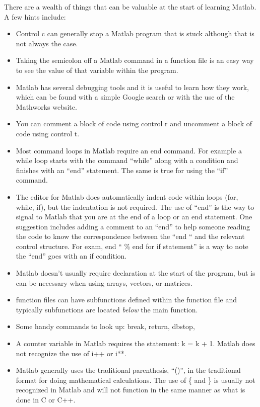 \documentclass[twoside]{article}
\begin{document}
There are a wealth of things that can be valuable at the start of learning Matlab. A few hints include:
\begin{itemize}

\item Control c can generally stop a Matlab program that is stuck although that is not always the case. 
\item Taking the semicolon off a Matlab command in a function file is an easy way to see the value of that variable within the program. 
\item Matlab has several debugging tools and it is useful to learn how they work, which can be found with a simple Google search or with the use of the Mathworks website. 
\item You can comment a block of code using control r and uncomment a block of code using control t. 
\item Most command loops in Matlab require an end command. For example a while loop starts with the command ``while'' along with a condition and finishes with an ``end'' statement. The same is true for using the ``if'' command. 
\item The editor for Matlab does automatically indent code within loops (for, while, if), but the indentation is not required. The use of ``end'' is the way to signal to Matlab that you are at the end of a loop or an end statement. One suggestion includes adding a comment to an ``end'' to help someone reading the code to know the correspondence between the ``end `` and the relevant control structure. For exam, end `` \% end for if statement'' is a way to note the ``end'' goes with an if condition. 
\item Matlab doesn't usually require declaration at the start of the program, but is can be necessary when using arrays, vectors, or matrices. 
\item function files can have subfunctions defined within the function file and typically subfunctions are located {\it below} the main function. 
\item Some handy commands to look up: break, return, dbstop, 
\item A counter variable in Matlab requires the statement: k = k + 1. Matlab does not recognize the use of i++ or i**.
\item Matlab generally uses the traditional parenthesis, ``()'', in the traditional format for doing mathematical calculations. The use of \{ and \} is usually not recognized in Matlab and will not function in the same manner as what is done in C or C++. 

\end{itemize}
\end{document}
